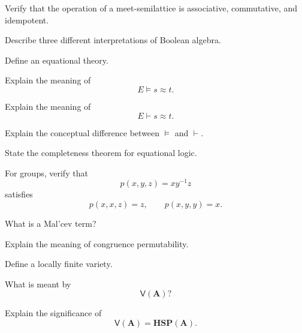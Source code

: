 \begin{exercise}[2]
Verify that the operation of a meet-semilattice is associative,
commutative, and idempotent.
\end{exercise}

\begin{exercise}[2]
Describe three different interpretations of Boolean algebra.
\end{exercise}

\begin{exercise}[1]
Define an equational theory.
\end{exercise}

\begin{exercise}[1]
Explain the meaning of
\[ E\models s\approx t. \]
\end{exercise}

\begin{exercise}[1]
Explain the meaning of
\[ E\vdash s\approx t. \]
\end{exercise}

\begin{exercise}[2]
Explain the conceptual difference between \(\models\) and \(\vdash\).
\end{exercise}

\begin{exercise}[2]
State the completeness theorem for equational logic.
\end{exercise}

\begin{exercise}[2]
For groups, verify that
\[ p(x,y,z)=xy^{-1}z \]
satisfies
\[ p(x,x,z)=z,\qquad p(x,y,y)=x. \]
\end{exercise}

\begin{exercise}[1]
What is a Mal'cev term?
\end{exercise}

\begin{exercise}[2]
Explain the meaning of congruence permutability.
\end{exercise}

\begin{exercise}[1]
Define a locally finite variety.
\end{exercise}

\begin{exercise}[1]
What is meant by
\[ \mathsf V(\mathbf A)? \]
\end{exercise}

\begin{exercise}[2]
Explain the significance of
\[ \mathsf V(\mathbf A)=\mathbf{HSP}(\mathbf A). \]
\end{exercise}

